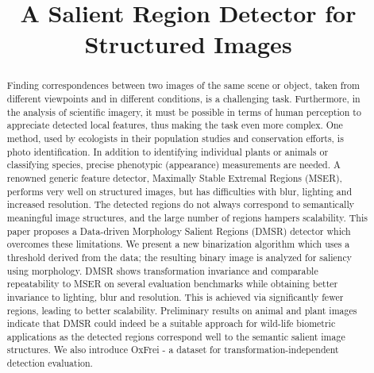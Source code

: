 \documentclass[conference,compsoc]{IEEEtran}
\begin{document}
%
\title{A Salient Region Detector for Structured Images}


\author{
}

\maketitle

\begin{abstract}
Finding correspondences between two images of the same scene or object, taken from different viewpoints and in different conditions, is a challenging task. Furthermore, in the analysis of scientific imagery, it must be possible in terms of human perception to appreciate detected local features, thus making the task even more complex. One method, used by ecologists in their population studies and conservation efforts, is photo identification. In addition to identifying individual plants or animals or classifying species, precise phenotypic (appearance) measurements are needed. A renowned generic feature detector, Maximally Stable Extremal Regions (MSER), performs very well on structured images, but has difficulties with blur, lighting and increased resolution. The detected regions do not always correspond to semantically meaningful image structures, and the large number of regions hampers scalability. This paper proposes a Data-driven Morphology Salient Regions (DMSR) detector which overcomes these limitations. We present a new binarization algorithm which uses a threshold derived from the data; the resulting binary image is analyzed for saliency using morphology. DMSR shows transformation invariance and comparable repeatability to MSER on several evaluation benchmarks while obtaining better invariance to lighting, blur and resolution. This is achieved via significantly fewer regions, leading to better scalability. Preliminary results on animal and plant images indicate that DMSR could indeed be a suitable approach for wild-life biometric applications as the detected regions correspond well to the semantic salient image structures. We also introduce OxFrei - a dataset for transformation-independent detection evaluation. 

\end{abstract}
\end{document}
